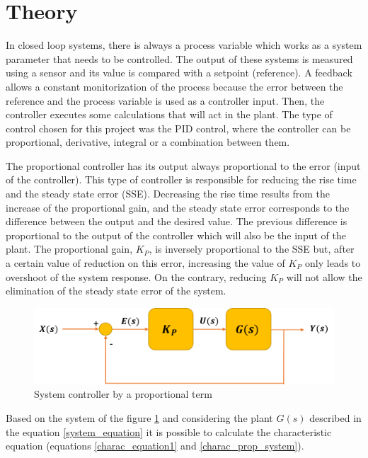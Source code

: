 \section{Theory}

In closed loop systems, there is always a process variable which works as a system parameter that needs to be controlled. The output of these systems is measured using a sensor and its value is compared with a setpoint (reference). A feedback allows a constant monitorization of the process because the error between the reference and the process variable is used as a controller input. Then, the controller executes some calculations that will act in the plant. The type of control chosen for this project was the PID control, where the controller can be proportional, derivative, integral or a combination between them. %

The proportional controller has its output always proportional to the error (input of the controller). This type of controller is responsible for reducing the rise time and the steady state error (SSE). Decreasing the rise time results from the increase of the proportional gain, and the steady state error corresponds to the difference between the output and the desired value. The previous difference is proportional to the output of the controller which will also be the input of the plant. The proportional gain, $K_P$, is inversely proportional to the SSE but, after a certain value of reduction on this error, increasing the value of $K_P$ only leads to overshoot of the system response. On the contrary, reducing $K_P$ will not allow the elimination of the steady state error of the system. 

\begin{figure}[H]
	\centering
	\includegraphics[scale=0.6]{figures/propor_controller.png}
	\caption{System controller by a proportional term}
	\label{propor_controller}
\end{figure}

Based on the system of the figure \ref{propor_controller} and considering the plant $G(s)$ described in the equation \ref{system_equation} it is possible to calculate the characteristic equation (equations \ref{charac_equation1} and \ref{charac_prop_system}).

